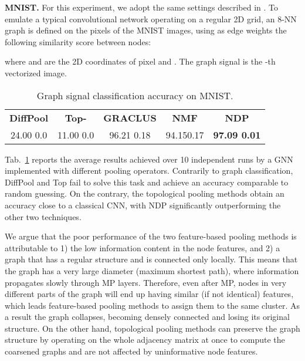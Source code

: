 \documentclass[journal]{IEEEtran}
\begin{document}
\textbf{MNIST.} 
For this experiment, we adopt the same settings described in \cite{defferrard2016convolutional}.
To emulate a typical convolutional network operating on a regular 2D grid, an 8-NN graph is defined on the  pixels of the MNIST images, using as edge weights the following similarity score between nodes:

where  and  are the 2D coordinates of pixel  and .
The graph signal  is the -th vectorized image.

\begin{table}
\setlength\tabcolsep{.7em} \small
\bgroup
\def\arraystretch{1.25} \centering
\caption{Graph signal classification accuracy on MNIST.}
\begin{tabular}{ccccc}
\cmidrule[1.5pt]{1-5}
\textbf{DiffPool} & \textbf{Top-} & \textbf{GRACLUS} & \textbf{NMF} & \textbf{NDP} \\
\cmidrule[.5pt]{1-5}
24.00 {\tiny 0.0} & 11.00 {\tiny 0.0} & 96.21 {\tiny 0.18} & 94.15{\tiny 0.17} & \textbf{97.09 {\tiny 0.01}} \\
\cmidrule[1.5pt]{1-5}
\end{tabular}
\label{tab:mnist_res}
\egroup
\end{table}


Tab.~\ref{tab:mnist_res} reports the average results achieved over 10 independent runs by a GNN implemented with different pooling operators.
Contrarily to graph classification, DiffPool and Top fail to solve this task and achieve an accuracy comparable to random guessing. 
On the contrary, the topological pooling methods obtain an accuracy close to a classical CNN, with NDP significantly outperforming the other two techniques. 

We argue that the poor performance of the two feature-based pooling methods is attributable to 1) the low information content in the node features, and 2) a graph that has a regular structure and is connected only locally. 
This means that the graph has a very large diameter (maximum shortest path), where information propagates slowly through MP layers.
Therefore, even after MP, nodes in very different parts of the graph will end up having similar (if not identical) features, which leads feature-based pooling methods to assign them to the same cluster.
As a result the graph collapses, becoming densely connected and losing its original structure.
On the other hand, topological pooling methods can preserve the graph structure by operating on the whole adjacency matrix at once to compute the coarsened graphs and are not affected by uninformative node features.
\end{document}

